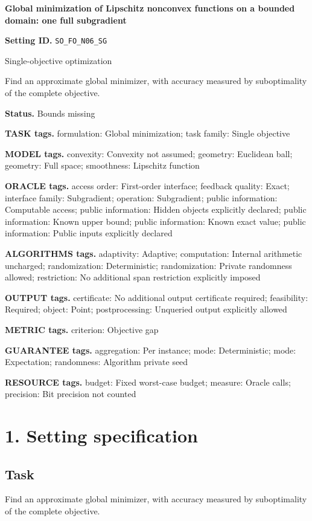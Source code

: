 \documentclass[10pt,a4paper]{article}
\begin{document}
\raggedright

{\LARGE\bfseries\sffamily\color{AtlasNavy} Global minimization of Lipschitz nonconvex functions on a bounded domain: one full subgradient\par}\vspace{5pt}
\textbf{Setting ID.} \texttt{SO\_\allowbreak{}FO\_\allowbreak{}N06\_\allowbreak{}SG}

Single-objective optimization

Find an approximate global minimizer, with accuracy measured by suboptimality of the complete objective.

\textbf{Status.} Bounds missing

\textbf{TASK tags.} formulation: Global minimization; task family: Single objective

\textbf{MODEL tags.} convexity: Convexity not assumed; geometry: Euclidean ball; geometry: Full space; smoothness: Lipschitz function

\textbf{ORACLE tags.} access order: First-order interface; feedback quality: Exact; interface family: Subgradient; operation: Subgradient; public information: Computable access; public information: Hidden objects explicitly declared; public information: Known upper bound; public information: Known exact value; public information: Public inputs explicitly declared

\textbf{ALGORITHMS tags.} adaptivity: Adaptive; computation: Internal arithmetic uncharged; randomization: Deterministic; randomization: Private randomness allowed; restriction: No additional span restriction explicitly imposed

\textbf{OUTPUT tags.} certificate: No additional output certificate required; feasibility: Required; object: Point; postprocessing: Unqueried output explicitly allowed

\textbf{METRIC tags.} criterion: Objective gap

\textbf{GUARANTEE tags.} aggregation: Per instance; mode: Deterministic; mode: Expectation; randomness: Algorithm private seed

\textbf{RESOURCE tags.} budget: Fixed worst-case budget; measure: Oracle calls; precision: Bit precision not counted

\section{1. Setting specification}
\subsection{Task}
Find an approximate global minimizer, with accuracy measured by suboptimality of the complete objective.
\end{document}
